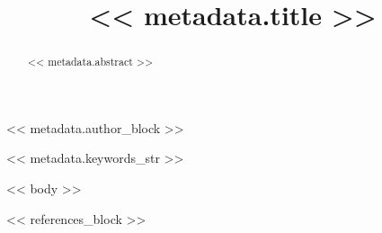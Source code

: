 \documentclass[conference]{IEEEtran}
\begin{document}
\title{<< metadata.title >>}
<< metadata.author_block >>




\maketitle

\begin{abstract}
<< metadata.abstract >>
\end{abstract}

\begin{IEEEkeywords}
<< metadata.keywords_str >>
\end{IEEEkeywords}

<< body >>

<< references_block >>
\end{document}
